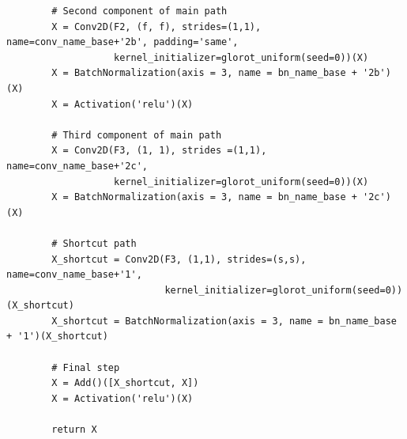 \documentclass[11pt, a4paper]{article}
\begin{document}
\begin{spacing}{1.1}
\begin{lstlisting}
		# Second component of main path 
		X = Conv2D(F2, (f, f), strides=(1,1), name=conv_name_base+'2b', padding='same', 
		           kernel_initializer=glorot_uniform(seed=0))(X)
		X = BatchNormalization(axis = 3, name = bn_name_base + '2b')(X)
		X = Activation('relu')(X)
		
		# Third component of main path 
		X = Conv2D(F3, (1, 1), strides =(1,1), name=conv_name_base+'2c', 
		           kernel_initializer=glorot_uniform(seed=0))(X)
		X = BatchNormalization(axis = 3, name = bn_name_base + '2c')(X)
		
		# Shortcut path
		X_shortcut = Conv2D(F3, (1,1), strides=(s,s), name=conv_name_base+'1', 
		                    kernel_initializer=glorot_uniform(seed=0))(X_shortcut)
		X_shortcut = BatchNormalization(axis = 3, name = bn_name_base + '1')(X_shortcut)
		
		# Final step
		X = Add()([X_shortcut, X])
		X = Activation('relu')(X)
		
		return X	\end{lstlisting} \newpage


\end{spacing}
\end{document}
